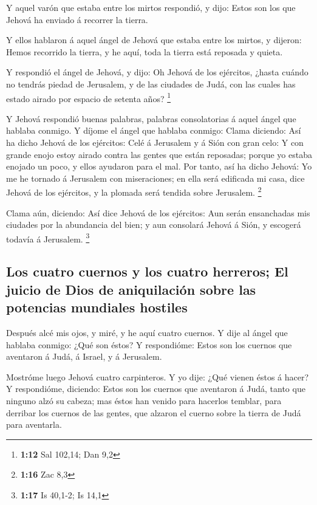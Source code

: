  Y aquel varón que estaba entre los mirtos respondió, y
dijo: Estos son los que Jehová ha enviado á recorrer la tierra.

 Y ellos hablaron á aquel ángel de Jehová que estaba entre
los mirtos, y dijeron: Hemos recorrido la tierra, y he aquí, toda la
tierra está reposada y quieta.

 Y respondió el ángel de Jehová, y dijo: Oh Jehová de los
ejércitos, ¿hasta cuándo no tendrás piedad de Jerusalem, y de las
ciudades de Judá, con las cuales has estado airado por espacio de
setenta años? \footnote{\textbf{1:12} Sal 102,14; Dan 9,2}

 Y Jehová respondió buenas palabras, palabras consolatorias
á aquel ángel que hablaba conmigo.  Y díjome el ángel que
hablaba conmigo: Clama diciendo: Así ha dicho Jehová de los ejércitos:
Celé á Jerusalem y á Sión con gran celo:  Y con grande
enojo estoy airado contra las gentes que están reposadas; porque yo
estaba enojado un poco, y ellos ayudaron para el mal.  Por
tanto, así ha dicho Jehová: Yo me he tornado á Jerusalem con
miseraciones; en ella será edificada mi casa, dice Jehová de los
ejércitos, y la plomada será tendida sobre Jerusalem. \footnote{\textbf{1:16}
  Zac 8,3}

 Clama aún, diciendo: Así dice Jehová de los ejércitos: Aun
serán ensanchadas mis ciudades por la abundancia del bien; y aun
consolará Jehová á Sión, y escogerá todavía á Jerusalem. \footnote{\textbf{1:17}
  Is 40,1-2; Is 14,1}

\hypertarget{los-cuatro-cuernos-y-los-cuatro-herreros-el-juicio-de-dios-de-aniquilaciuxf3n-sobre-las-potencias-mundiales-hostiles}{%
\subsection{Los cuatro cuernos y los cuatro herreros; El juicio de Dios
de aniquilación sobre las potencias mundiales
hostiles}\label{los-cuatro-cuernos-y-los-cuatro-herreros-el-juicio-de-dios-de-aniquilaciuxf3n-sobre-las-potencias-mundiales-hostiles}}

 Después alcé mis ojos, y miré, y he aquí cuatro cuernos.
 Y dije al ángel que hablaba conmigo: ¿Qué son éstos? Y
respondióme: Estos son los cuernos que aventaron á Judá, á Israel, y á
Jerusalem.

 Mostróme luego Jehová cuatro carpinteros.  Y
yo dije: ¿Qué vienen éstos á hacer? Y respondióme, diciendo: Estos son
los cuernos que aventaron á Judá, tanto que ninguno alzó su cabeza; mas
éstos han venido para hacerlos temblar, para derribar los cuernos de las
gentes, que alzaron el cuerno sobre la tierra de Judá para aventarla.

